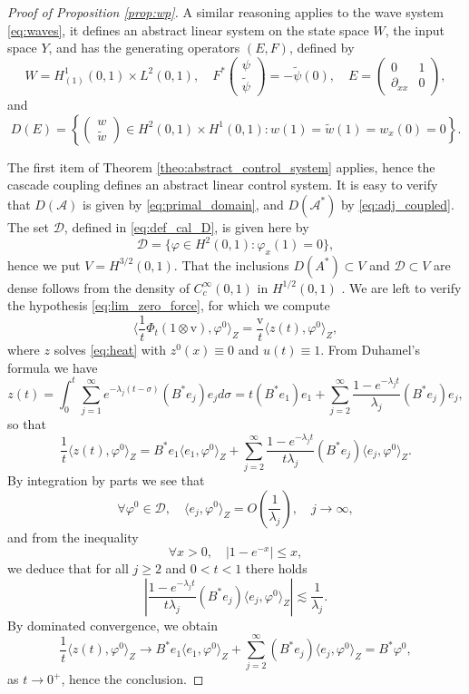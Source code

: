 \documentclass[10pt]{article}
\begin{document}
\begin{proof}[Proof of Proposition \ref{prop:wp}]
A similar reasoning applies to the wave system \eqref{eq:waves}, it defines an abstract linear system on the state space $W$, the input space $Y$, and has the generating operators $(E,F)$, defined by
\[
W = H^1_{(1)}(0,1) \times L^2(0,1), \quad F^*  \left( \begin{array}{c}
\psi \\
\tilde{\psi}
\end{array}\right) = - \tilde{\psi}(0),\quad E = \left( \begin{array}{cc}
0 & 1 \\
\partial_{xx} & 0
\end{array} \right),
\]
and
\[
D(E) = \left\lbrace \left( \begin{array}{c}
w \\
\tilde{w}
\end{array}\right) \in H^2(0,1) \times H^1(0,1) : w(1) = \tilde{w}(1) = w_x(0) = 0 \right\rbrace.
\]

The first item of Theorem \ref{theo:abstract_control_system} applies, hence the cascade coupling defines an abstract linear control system. It is easy to verify that $D(\mathcal{A})$ is given by \eqref{eq:primal_domain}, and $D(\mathcal{A}^*)$ by \eqref{eq:adj_coupled}. The set $\mathcal{D}$, defined in \eqref{eq:def_cal_D}, is given here by 
\[
\mathcal{D} = \{ \varphi \in H^2(0,1) : \varphi_x(1) = 0 \},
\]
hence we put $V = H^{3/2}(0,1)$. That the inclusions $D(A^*) \subset V$ and $\mathcal{D} \subset V$ are dense follows from the density of $C_c^\infty(0,1)$ in $H^{1/2}(0,1)$ \cite[Chapter 1, Theorem 11.1]{LM1}. We are left to verify the hypothesis \eqref{eq:lim_zero_force}, for which we compute 
\[
\langle \frac{1}{t} \Phi_t (1 \otimes \mathrm{v}) , \varphi^0 \rangle_Z = \frac{\mathrm{v}}{t} \langle z(t), \varphi^0 \rangle_Z ,
\] 
where $z$ solves \eqref{eq:heat} with $z^0(x) \equiv 0$ and $u(t) \equiv 1$. From Duhamel's formula we have 
\[
z(t) = \int_0^t \sum_{j=1}^\infty e^{-\lambda_j(t-\sigma)} (B^*e_j)e_j d\sigma = t (B^* e_1)e_1 + \sum_{j=2}^\infty \frac{1-e^{-\lambda_j t}}{\lambda_j}(B^*e_j)e_j,
\]
so that 
\[
\frac{1}{t}\langle z(t) , \varphi^0 \rangle_Z = B^*e_1 \langle e_1,\varphi^0 \rangle_Z + \sum_{j=2}^\infty \frac{1-e^{-\lambda_j t}}{t\lambda_j}(B^*e_j) \langle e_j , \varphi^0 \rangle_Z.
\]
By integration by parts we see that 
\[
\forall \varphi^0 \in \mathcal{D},\quad \langle e_j, \varphi^0 \rangle_Z = O\left( \frac{1}{\lambda_j} \right),\quad j \to \infty,
\]
and from the inequality 
\[
\forall x > 0,\quad |1-e^{-x}| \leq x,
\]
we deduce that for all $j \geq 2$ and $0 < t < 1$ there holds 
\[
\left| \frac{1-e^{-\lambda_j t}}{t\lambda_j}(B^*e_j) \langle e_j , \varphi^0 \rangle_Z \right| \lesssim \frac{1}{\lambda_j}.
\]
By dominated convergence, we obtain 
\[
\frac{1}{t}\langle z(t) , \varphi^0 \rangle_Z \to B^*e_1 \langle e_1,\varphi^0 \rangle_Z + \sum_{j=2}^\infty (B^*e_j) \langle e_j , \varphi^0 \rangle_Z = B^*\varphi^0,
\]
as $t \to 0^+$, hence the conclusion. 
\end{proof}
\end{document}
